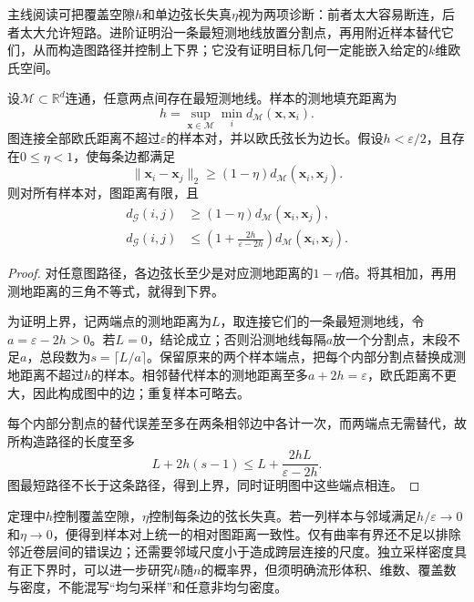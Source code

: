主线阅读可把覆盖空隙$h$和单边弦长失真$\eta$视为两项诊断：前者太大容易断连，后者太大允许短路。进阶证明沿一条最短测地线放置分割点，再用附近样本替代它们，从而构造图路径并控制上下界；它没有证明目标几何一定能嵌入给定的$k$维欧氏空间。

\begin{theorem}[覆盖条件下的图距离界]
  \label{thm:dim-isomap-bound}
  设$\mathcal{M}\subset\mathbb{R}^d$连通，任意两点间存在最短测地线。样本的测地填充距离为
  \[
    h=\sup_{\bm{x}\in\mathcal{M}}\min_i
      d_{\mathcal{M}}(\bm{x},\bm{x}_i).
  \]
  图连接全部欧氏距离不超过$\varepsilon$的样本对，并以欧氏弦长为边长。假设$h<\varepsilon/2$，且存在$0\leq\eta<1$，使每条边都满足
  \[
    \lVert\bm{x}_i-\bm{x}_j\rVert_2
    \geq(1-\eta)d_{\mathcal{M}}(\bm{x}_i,\bm{x}_j).
  \]
  则对所有样本对，图距离有限，且
  \begin{equation}
    \label{eq:dim-isomap-bound}
    \begin{aligned}
      d_{\mathcal{G}}(i,j)
        &\geq(1-\eta)d_{\mathcal{M}}(\bm{x}_i,\bm{x}_j),\\
      d_{\mathcal{G}}(i,j)
        &\leq\left(1+\frac{2h}{\varepsilon-2h}\right)
          d_{\mathcal{M}}(\bm{x}_i,\bm{x}_j).
    \end{aligned}
  \end{equation}
\end{theorem}
\begin{proof}
  对任意图路径，各边弦长至少是对应测地距离的$1-\eta$倍。将其相加，再用测地距离的三角不等式，就得到下界。

  为证明上界，记两端点的测地距离为$L$，取连接它们的一条最短测地线，令$a=\varepsilon-2h>0$。若$L=0$，结论成立；否则沿测地线每隔$a$放一个分割点，末段不足$a$，总段数为$s=\lceil L/a\rceil$。保留原来的两个样本端点，把每个内部分割点替换成测地距离不超过$h$的样本。相邻替代样本的测地距离至多$a+2h=\varepsilon$，欧氏距离不更大，因此构成图中的边；重复样本可略去。

  每个内部分割点的替代误差至多在两条相邻边中各计一次，而两端点无需替代，故所构造路径的长度至多
  \[
    L+2h(s-1)
    \leq L+\frac{2hL}{\varepsilon-2h}.
  \]
  图最短路径不长于这条路径，得到上界，同时证明图中这些端点相连。
\end{proof}

定理中$h$控制覆盖空隙，$\eta$控制每条边的弦长失真。若一列样本与邻域满足$h/\varepsilon\to0$和$\eta\to0$，便得到样本对上统一的相对图距离一致性。仅有曲率有界还不足以排除邻近卷层间的错误边；还需要邻域尺度小于造成跨层连接的尺度。独立采样密度具有正下界时，可以进一步研究$h$随$n$的概率界，但须明确流形体积、维数、覆盖数与密度，不能混写“均匀采样”和任意非均匀密度。


